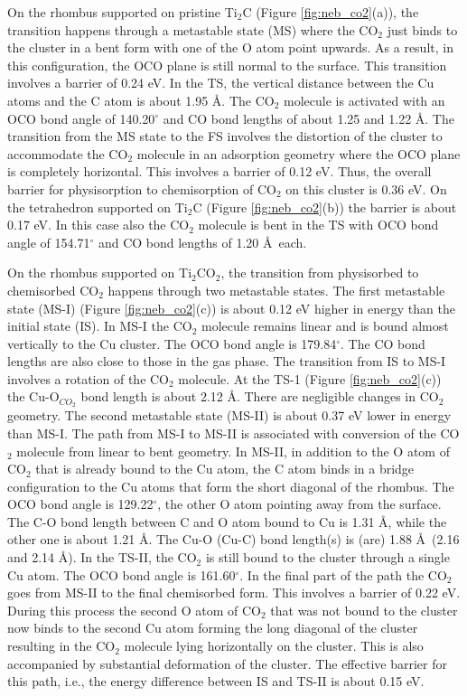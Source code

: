 On the rhombus supported on pristine Ti$_2$C (Figure \ref{fig:neb_co2}(a)), the transition happens through
a metastable state (MS) where the CO$_2$ just binds to the cluster in a bent form with one of the O atom
point upwards. As a result, in this configuration, the OCO plane is still normal to the surface.
This transition involves a barrier of 0.24 eV. In the TS, the vertical distance between the Cu
atoms and the C atom is about 1.95 \AA. The CO$_2$ molecule is activated with an OCO bond angle of 140.20$^\circ$
and CO bond lengths of about 1.25 and 1.22 \AA. The transition from the MS state to the FS involves the distortion
of the cluster to accommodate the CO$_2$ molecule in an adsorption geometry where the OCO plane is completely
horizontal. This involves a barrier of 0.12 eV. Thus, the overall barrier for physisorption
to chemisorption of CO$_2$ on this cluster is 0.36 eV.
On the tetrahedron supported on Ti$_2$C (Figure \ref{fig:neb_co2}(b)) the
barrier is about 0.17 eV. In this case also the CO$_2$ molecule is bent in the TS with OCO bond
angle of 154.71$^\circ$ and CO bond lengths of 1.20 \AA~each.

On the rhombus supported on Ti$_2$CO$_2$, the transition from physisorbed to chemisorbed CO$_2$
happens through two metastable states. The first metastable state (MS-I) (Figure \ref{fig:neb_co2}(c)) is about 0.12 eV higher in energy than the initial state (IS). In MS-I the CO$_2$ molecule remains linear and is bound
almost vertically to the Cu cluster. The OCO bond angle is 179.84$^\circ$. The CO bond lengths are
also close to those in the gas phase. The transition from IS to MS-I involves a rotation of the
CO$_2$ molecule. At the TS-1 (Figure \ref{fig:neb_co2}(c)) the Cu-O$_{CO_2}$ bond length is about 2.12 \AA. There are 
negligible changes in CO$_2$ geometry. The second metastable state (MS-II) is about 0.37 eV
lower in energy than MS-I. The path from MS-I to MS-II is associated with conversion of the
CO$_2$ molecule from linear to bent geometry. In MS-II, in addition to the O atom of CO$_2$ that
is already bound to the Cu atom, the C atom binds in a bridge configuration to the Cu atoms
that form the short diagonal of the rhombus. The OCO bond angle is 129.22$^\circ$, the other O
atom pointing away from the surface. The C-O bond length between C and O atom bound to
Cu is 1.31 \AA, while the other one is about 1.21 \AA. The Cu-O (Cu-C) bond length(s) is 
(are) 1.88 \AA~(2.16 and 2.14 \AA). In the TS-II, the CO$_2$ is still bound to the cluster
through a single Cu atom. The OCO bond angle is 161.60$^\circ$. In the final part of the path
the CO$_2$ goes from MS-II to the final chemisorbed form. This involves a barrier of 0.22 eV.
During this process the second O atom of CO$_2$ that was not bound to the cluster now
binds to the second Cu atom forming the long diagonal of the cluster resulting in the CO$_2$
molecule lying horizontally on the cluster. This is also accompanied by substantial
deformation of the cluster. The effective barrier for this path, i.e., the energy difference
between IS and TS-II is about 0.15 eV.

